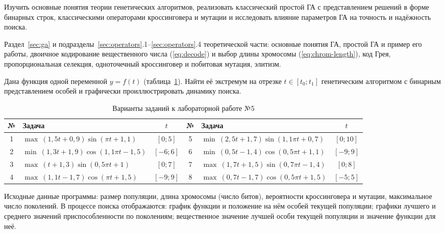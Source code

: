 
Изучить основные понятия теории генетических алгоритмов, реализовать классический простой ГА с
представлением решений в форме бинарных строк, классическими операторами кроссинговера и мутации и
исследовать влияние параметров ГА на точность и надёжность поиска.

Раздел~\ref{sec:ga} и подразделы~\ref{sec:operators}.1--\ref{sec:operators}.4 теоретической части:
основные понятия ГА, простой ГА и пример его работы, двоичное кодирование вещественного числа
(\ref{eq:decode}) и выбор длины хромосомы (\ref{eq:chrom-length}), код Грея, пропорциональная селекция,
одноточечный кроссинговер и побитовая мутация, элитизм.

Дана функция одной переменной $y = f(t)$ (таблица~\ref{tab:l5-var}). Найти её экстремум на отрезке
$t \in [t_0; t_1]$ генетическим алгоритмом с бинарным представлением особей и графически
проиллюстрировать динамику поиска.

\begin{table}[!htb]
\caption{Варианты заданий к лабораторной работе №5}
\label{tab:l5-var}
\centering\small\setlength{\tabcolsep}{3.5pt}
\begin{tabular}{clc|clc}
\toprule
№ & Задача & $t$ & № & Задача & $t$ \\
\midrule
1 & $\max\ (1,5t + 0,9)\sin(\pi t + 1,1)$      & $[0; 5]$   & 5 & $\min\ (2,5t + 1,7)\sin(1,1\pi t + 0,7)$ & $[0; 10]$ \\
2 & $\min\ (1,3t + 1,9)\cos(1,1\pi t - 1,5)$    & $[-6; 6]$  & 6 & $\min\ (0,5t - 1,4)\cos(0,5\pi t + 1,1)$ & $[-9; 9]$ \\
3 & $\max\ (t + 1,3)\sin(0,5\pi t + 1)$         & $[0; 7]$   & 7 & $\max\ (1,7t + 1,5)\sin(0,7\pi t - 1,4)$ & $[0; 8]$ \\
4 & $\max\ (1,1t - 1,7)\cos(\pi t + 1,5)$       & $[-9; 9]$  & 8 & $\max\ (0,7t - 1,7)\cos(0,5\pi t + 1,5)$ & $[-5; 5]$ \\
\bottomrule
\end{tabular}
\end{table}

Исходные данные программы: размер популяции, длина хромосомы (число битов), вероятности кроссинговера и
мутации, максимальное число поколений. В процессе поиска отображаются: график функции и положение на
нём особей текущей популяции; графики лучшего и среднего значений приспособленности по поколениям;
вещественное значение лучшей особи текущей популяции и значение функции для неё.

